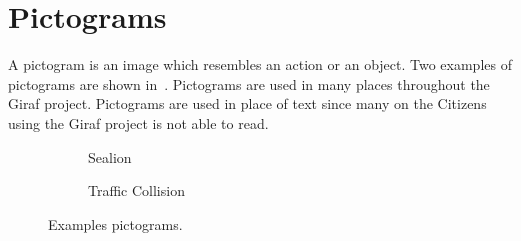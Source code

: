 \section{Pictograms}
A pictogram is an image which resembles an action or an object. 
Two examples of pictograms are shown in~.
Pictograms are used in many places throughout the Giraf project. 
Pictograms are used in place of text since many on the Citizens using the Giraf project is not able to read. 

\begin{figure}[H]
    \centering
    \begin{subfigure}[b]{0.2\textwidth}
        \caption{Sealion}
        \label{fig:sealion}
    \end{subfigure}
    \qquad 
    \begin{subfigure}[b]{0.2\textwidth}
        \caption{Traffic Collision}
        \label{fig:traffic_collision}
    \end{subfigure}
    \caption{Examples pictograms.}\label{fig:pictograms}
\end{figure}

